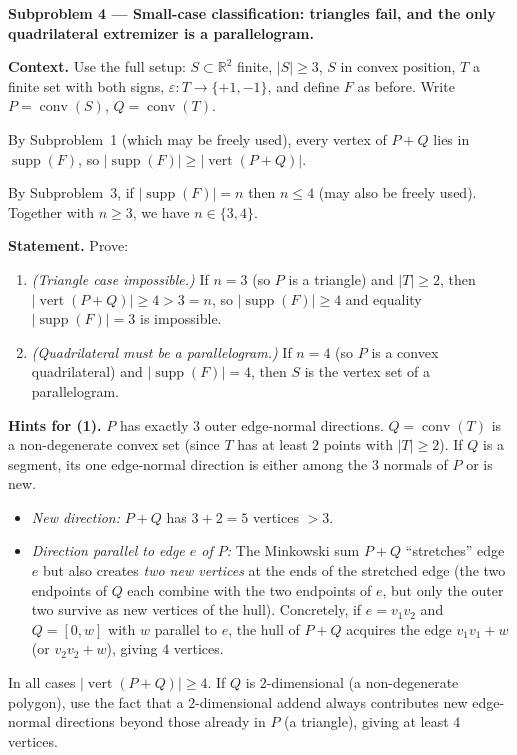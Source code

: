 \documentclass{article}
\begin{document}
\textbf{Subproblem 4 --- Small-case classification: triangles fail, and the only
quadrilateral extremizer is a parallelogram.}

\medskip
\textbf{Context.}
Use the full setup: $S\subset\mathbb{R}^2$ finite, $|S|\ge 3$, $S$ in convex
position, $T$ a finite set with both signs, $\varepsilon:T\to\{+1,-1\}$,
and define $F$ as before.  Write $P=\operatorname{conv}(S)$,
$Q=\operatorname{conv}(T)$.

By Subproblem~1 (which may be freely used), every vertex of $P+Q$ lies in
$\operatorname{supp}(F)$, so $|\operatorname{supp}(F)|\ge|\operatorname{vert}(P+Q)|$.

By Subproblem~3, if $|\operatorname{supp}(F)|=n$ then $n\le 4$ (may also be freely
used).  Together with $n\ge 3$, we have $n\in\{3,4\}$.

\medskip
\textbf{Statement.}  Prove:
\begin{enumerate}
  \item \emph{(Triangle case impossible.)}  If $n=3$ (so $P$ is a triangle) and
        $|T|\ge 2$, then $|\operatorname{vert}(P+Q)|\ge 4 > 3 = n$, so
        $|\operatorname{supp}(F)|\ge 4$ and equality $|\operatorname{supp}(F)|=3$ is
        impossible.
  \item \emph{(Quadrilateral must be a parallelogram.)}  If $n=4$ (so $P$ is a
        convex quadrilateral) and $|\operatorname{supp}(F)|=4$, then $S$ is the
        vertex set of a parallelogram.
\end{enumerate}

\medskip
\textbf{Hints for (1).}
$P$ has exactly $3$ outer edge-normal directions.  $Q=\operatorname{conv}(T)$ is
a non-degenerate convex set (since $T$ has at least $2$ points with $|T|\ge 2$).
If $Q$ is a segment, its one edge-normal direction is either among the $3$
normals of $P$ or is new.
\begin{itemize}
  \item \emph{New direction:} $P+Q$ has $3+2=5$ vertices $>3$.
  \item \emph{Direction parallel to edge $e$ of $P$:} The Minkowski sum
        $P+Q$ ``stretches'' edge $e$ but also creates \emph{two new vertices} at
        the ends of the stretched edge (the two endpoints of $Q$ each combine
        with the two endpoints of $e$, but only the outer two survive as new
        vertices of the hull). Concretely, if $e=v_1v_2$ and $Q=[0,w]$ with $w$
        parallel to $e$, the hull of $P+Q$ acquires the edge $v_1 v_1+w$ (or
        $v_2 v_2+w$), giving $4$ vertices.
\end{itemize}
In all cases $|\operatorname{vert}(P+Q)|\ge 4$.
If $Q$ is $2$-dimensional (a non-degenerate polygon), use the fact that a
$2$-dimensional addend always contributes new edge-normal directions beyond
those already in $P$ (a triangle), giving at least $4$ vertices.
\end{document}

